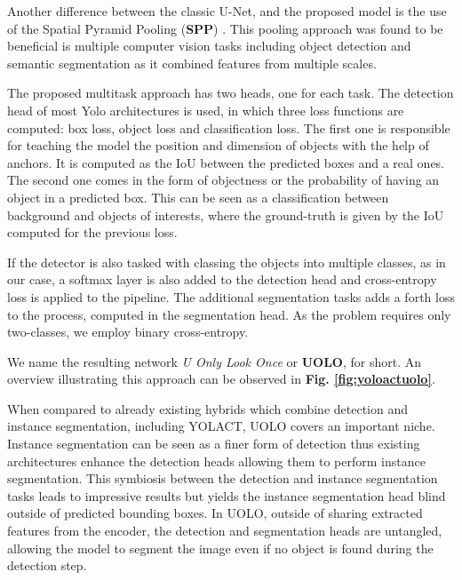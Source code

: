 \documentclass[conference]{IEEEtran}
\begin{document}
Another difference between the classic U-Net, and the proposed model is the use of the Spatial Pyramid Pooling (\textbf{SPP}) \cite{hezhang2015spp}. This pooling approach was found to be beneficial is multiple computer vision tasks including object detection and semantic segmentation as it combined features from multiple scales.

The proposed multitask approach has  two heads, one for each task. The detection head of most Yolo architectures is used, in which three loss functions are computed: box loss, object loss and classification loss. The first one is responsible for teaching the model the position and dimension of objects with the help of anchors. It is computed as the IoU between the predicted boxes and a real ones. The second one comes in the form of objectness or the probability of having an object in a predicted box. This can be seen as a classification between background and objects of interests, where the ground-truth is given by the IoU computed for the previous loss.

If the detector is also tasked with classing the objects into multiple classes, as in our case, a softmax layer is also added to the detection head and cross-entropy loss is applied to the pipeline. The additional segmentation tasks adds a forth loss to the process, computed in the segmentation head. As the problem requires only two-classes, we employ binary cross-entropy.

We name the resulting network \textit{U Only Look Once} or \textbf{UOLO}, for short. An overview illustrating this approach can be observed in \textbf{Fig. \ref{fig:yoloactuolo}}.

When compared to already existing hybrids which combine detection and instance segmentation, including YOLACT, UOLO covers an important niche. Instance segmentation can be seen as a finer form of detection thus existing architectures enhance the detection heads allowing them to perform instance segmentation. This symbiosis between the detection and instance segmentation tasks leads to impressive results but yields the instance segmentation head blind outside of predicted bounding boxes. In UOLO, outside of sharing extracted features from the encoder, the detection and segmentation heads are untangled, allowing the model to segment the image even if no object is found during the detection step.

\end{document}
